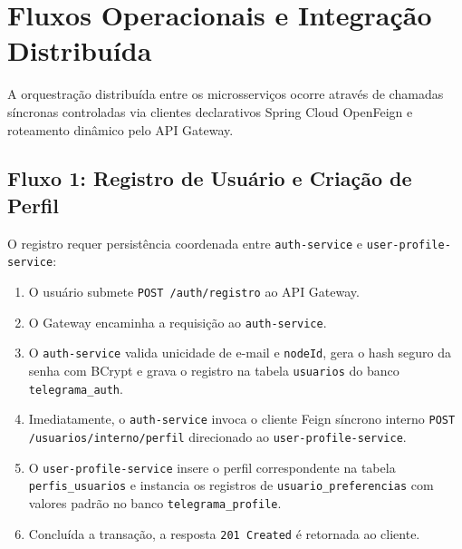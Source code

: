\documentclass[12pt,a4paper]{report}
\begin{document}
\chapter{Fluxos Operacionais e Integração Distribuída}

A orquestração distribuída entre os microsserviços ocorre através de chamadas síncronas controladas via clientes declarativos Spring Cloud OpenFeign e roteamento dinâmico pelo API Gateway.

\section{Fluxo 1: Registro de Usuário e Criação de Perfil}
O registro requer persistência coordenada entre \texttt{auth-service} e \texttt{user-profile-service}:
\begin{enumerate}
    \item O usuário submete \texttt{POST /auth/registro} ao API Gateway.
    \item O Gateway encaminha a requisição ao \texttt{auth-service}.
    \item O \texttt{auth-service} valida unicidade de e-mail e \texttt{nodeId}, gera o hash seguro da senha com BCrypt e grava o registro na tabela \texttt{usuarios} do banco \texttt{telegrama\_auth}.
    \item Imediatamente, o \texttt{auth-service} invoca o cliente Feign síncrono interno \texttt{POST /usuarios/interno/perfil} direcionado ao \texttt{user-profile-service}.
    \item O \texttt{user-profile-service} insere o perfil correspondente na tabela \texttt{perfis\_usuarios} e instancia os registros de \texttt{usuario\_preferencias} com valores padrão no banco \texttt{telegrama\_profile}.
    \item Concluída a transação, a resposta \texttt{201 Created} é retornada ao cliente.
\end{enumerate}
\end{document}
